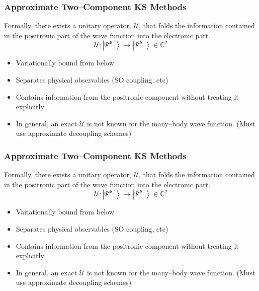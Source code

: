 \documentclass{beamer}
\newcommand{\ket}[1]{\left \vert #1 \right \rangle}
\begin{document}
\begin{frame}
\frametitle{Approximate Two--Component KS Methods}

Formally, there exists a unitary operator, $\mathcal{U}$, that folds the information
contained in the positronic part of the wave function into the electronic part.
\begin{equation*}
\mathcal{U} : \ket{\Psi^\mathrm{4C}} \rightarrow \ket{\Psi^\mathrm{2C}} \in \mathbb{C}^2
\end{equation*}

\begin{itemize}
  \color{white}
  \item[\color{white}] Variationally bound from below
  \item[\color{white}] Separates physical observables (SO coupling, etc)
  \item[\color{white}] Contains information from the positronic component without treating it explicitly
\end{itemize}

\begin{itemize}
  \color{white}
  \item[\color{white}] In general, an exact $\mathcal{U}$ is not known for the many--body wave function.
  (Must use approximate decoupling schemes)
\end{itemize}

\end{frame}

\begin{frame}
\frametitle{Approximate Two--Component KS Methods}

Formally, there exists a unitary operator, $\mathcal{U}$, that folds the information
contained in the positronic part of the wave function into the electronic part.
\begin{equation*}
\mathcal{U} : \ket{\Psi^\mathrm{4C}} \rightarrow \ket{\Psi^\mathrm{2C}} \in \mathbb{C}^2
\end{equation*}

\begin{itemize}
  \color{green}
  \item Variationally bound from below
  \color{white}
  \item[\color{white}] Separates physical observables (SO coupling, etc)
  \item[\color{white}] Contains information from the positronic component without treating it explicitly
\end{itemize}

\begin{itemize}
  \color{white}
  \item[\color{white}] In general, an exact $\mathcal{U}$ is not known for the many--body wave function.
  (Must use approximate decoupling schemes)
\end{itemize}

\end{frame}
\end{document}
